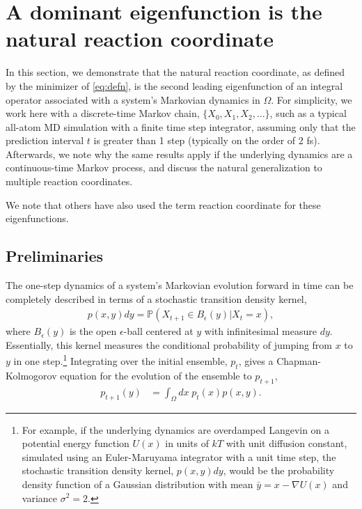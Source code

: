 \documentclass[aip, jcp, reprint, nolinenumbers, twocolumn, nobalancelastpage, nofootinbib]{revtex4-1}
\begin{document}
\section{A dominant eigenfunction is the natural reaction coordinate}
\label{sect:natureal_reaction}
In this section, we demonstrate that the natural reaction coordinate, as defined by the minimizer of \cref{eq:defn}, is the second leading eigenfunction of an integral operator associated with a system's Markovian dynamics in $\Omega$. For simplicity, we work here with a discrete-time Markov chain, $\{X_0, X_1, X_2, \ldots \}$, such as a typical all-atom MD simulation with a finite time step integrator, assuming only that the prediction interval $t$ is greater than 1 step (typically on the order of 2 fs). Afterwards, we note why the same results apply if the underlying dynamics are a continuous-time Markov process, and discuss the natural generalization to multiple reaction coordinates.

We note that others have also used the term reaction coordinate for these eigenfunctions.\cite{nadler2006diffusion, rohrdanz2011determination}

\subsection{Preliminaries}
\label{subsect:theory_prelim}
The one-step dynamics of a system's Markovian evolution forward in time can be completely described in terms of a stochastic transition density kernel,
\begin{align}
    p(x, y)dy = \mathbb{P}(X_{t+1} \in B_\epsilon(y) | X_t = x),
\end{align}
where $B_\epsilon(y)$ is the open $\epsilon$-ball centered at $y$ with infinitesimal measure $dy$. Essentially, this kernel measures the conditional probability of jumping from $x$ to $y$ in one step.\footnote{For example, if the underlying dynamics are overdamped Langevin on a potential energy function $U(x)$ in units of $kT$ with unit diffusion constant, simulated using an Euler-Maruyama integrator with a unit time step, the stochastic transition density kernel, $p(x, y)dy$, would be the probability density function of a Gaussian distribution with mean $\bar{y}=x-\nabla U(x)$ and variance $\sigma^2=2$.} Integrating over the initial ensemble, $p_t$, gives a Chapman-Kolmogorov equation for the evolution of the ensemble to $p_{t+1}$,
\begin{align}
    p_{t+1}(y) &= \int_{\Omega} dx\; p_t(x) p(x, y).
\end{align}
\end{document}
